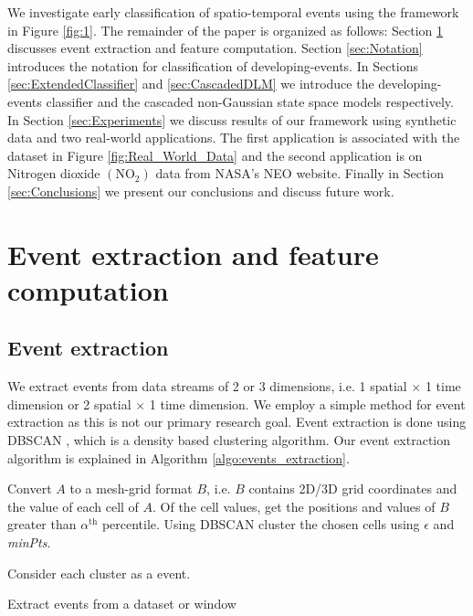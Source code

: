 \documentclass[11pt]{article}
\begin{document}
	
	We investigate early classification of spatio-temporal events using the framework in Figure \ref{fig:1}. The remainder of the paper is organized as follows: Section \ref{sec:EventExtract} discusses event extraction and feature computation. Section \ref{sec:Notation}  introduces the notation for classification of developing-events. In Sections \ref{sec:ExtendedClassifier} and  \ref{sec:CascadedDLM} we introduce the developing-events classifier and the cascaded non-Gaussian state space models respectively. %
	In Section \ref{sec:Experiments} we discuss results of our framework using synthetic data and two real-world applications. The first  application is associated with the dataset in Figure \ref{fig:Real_World_Data} and the second application is on Nitrogen dioxide $(\text{NO}_2)$ data from NASA's  NEO \cite{OMINO2} website. Finally in Section \ref{sec:Conclusions} we present our conclusions and discuss future work.  
	
		
	\section{Event extraction and feature computation} \label{sec:EventExtract}
	
	\subsection{Event extraction}
	 We extract events from data streams of 2 or 3 dimensions, i.e. 1 spatial $ \times $ 1 time dimension or 2 spatial $ \times $ 1 time dimension.  We employ a simple method for event extraction as this is not our primary research goal.  Event extraction is done using DBSCAN \cite{ester1996density}, which is a density based clustering algorithm. Our event extraction algorithm is explained in Algorithm \ref{algo:events_extraction}.
	 
	 \DontPrintSemicolon
	 \begin{algorithm}[!ht]
	 	\footnotesize
	  	Convert $A$ to a mesh-grid format $B$, i.e. $B$ contains 2D/3D grid coordinates and the value of each cell of $A$.  \;
	 	Of the cell values, get the positions and values of $B$ greater than $\alpha^{\text{th}}$ percentile. \;
	 	Using DBSCAN cluster the chosen cells using $\epsilon$ and {\it minPts}. \;
	 	
	 	Consider each cluster as a event. \, 
	 	\caption{\footnotesize Extract events from a dataset or window}
	 	\label{algo:events_extraction}
	 \end{algorithm}
	 
\end{document}
